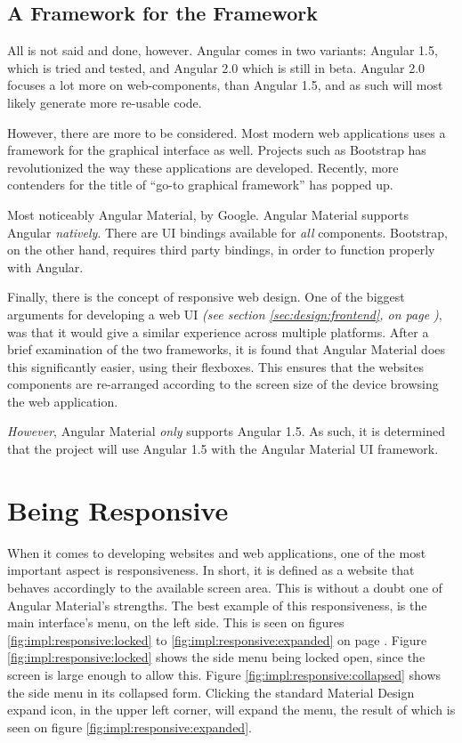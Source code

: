 		\subsection{A Framework for the Framework}
			All is not said and done, however. Angular comes in two variants: Angular 1.5, which is tried and tested, and Angular 2.0 which is still in beta. Angular 2.0 focuses a lot more on web-components, than Angular 1.5, and as such will most likely generate more re-usable code. 

			However, there are more to be considered. Most modern web applications uses a framework for the graphical interface as well. Projects such as Bootstrap has revolutionized the way these applications are developed. Recently, more contenders for the title of ``go-to graphical framework'' has popped up.

			Most noticeably Angular Material, by Google. Angular Material supports Angular \emph{natively}. There are UI bindings available for \emph{all} components. Bootstrap, on the other hand, requires third party bindings, in order to function properly with Angular.

			Finally, there is the concept of responsive web design. One of the biggest arguments for developing a web UI \emph{(see section \ref{sec:design:frontend}, on page \pageref{sec:design:frontend})}, was that it would give a similar experience across multiple platforms. After a brief examination of the two frameworks, it is found that Angular Material does this significantly easier, using their flexboxes. This ensures that the websites components are re-arranged according to the screen size of the device browsing the web application.

			\emph{However}, Angular Material \emph{only} supports Angular 1.5. As such, it is determined that the project will use Angular 1.5 with the Angular Material UI framework.

	\section{Being Responsive}
		When it comes to developing websites and web applications, one of the most important aspect is responsiveness. In short, it is defined as a website that behaves accordingly to the available screen area. This is without a doubt one of Angular Material's strengths. The best example of this responsiveness, is the main interface's menu, on the left side. This is seen on figures \ref{fig:impl:responsive:locked} to \ref{fig:impl:responsive:expanded} on page \pageref{fig:impl:responsive:locked}. Figure \ref{fig:impl:responsive:locked} shows the side menu being locked open, since the screen is large enough to allow this. Figure \ref{fig:impl:responsive:collapsed} shows the side menu in its collapsed form. Clicking the standard Material Design expand icon, in the upper left corner, will expand the menu, the result of which is seen on figure \ref{fig:impl:responsive:expanded}.

